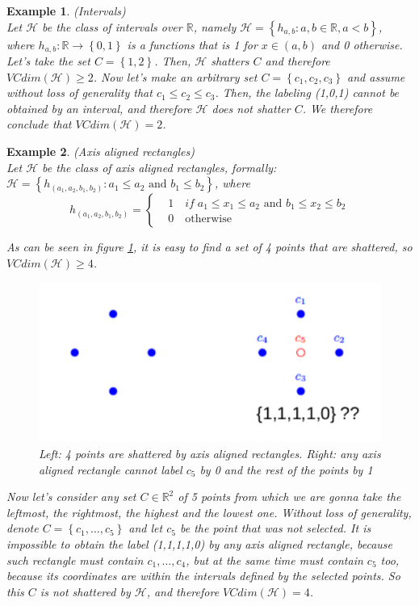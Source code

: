 \documentclass[12pt]{report}
\theoremstyle{plain}
\newtheorem{EX}{Example}
\newcommand\mcl[1]{\mathcal{#1}}
\begin{document}
\begin{flushleft}
\begin{EX} (Intervals)\\
	Let $\mcl{H}$ be the class of intervals over $\mathds{R}$, namely $\mcl{H}=\left\{h_{a,b}:a,b\in\mathds{R},a<b\right\}$, where $h_{a,b}:\mathds{R}\to\left\{0,1\right\}$ is a functions that is 1 for $x\in(a,b)$ and 0 otherwise. Let's take the set $C=\left\{1,2\right\}$. Then, $\mcl{H}$ shatters $C$ and therefore $VCdim(\mcl{H})\geq 2$. Now let's make an arbitrary set $C=\left\{c_1,c_2,c_3\right\}$ and assume without loss of generality that $c_1\leq c_2\leq c_3$. Then, the labeling (1,0,1) cannot be obtained by an interval, and therefore $\mcl{H}$ does not shatter $C$. We therefore conclude that $VCdim(\mcl{H})=2$.
\end{EX}

\begin{EX} (Axis aligned rectangles)\\
	Let $\mcl{H}$ be the class of axis aligned rectangles, formally: $\mcl{H}=\left\{h_{(a_1,a_2,b_1,b_2)}:a_1\leq a_2 \text{ and } b_1\leq b_2 \right\}$, where 
	\[ h_{(a_1,a_2,b_1,b_2)} = \left\{\begin{aligned}&1\quad if\; a_1\leq x_1\leq a_2 \text{ and } b_1\leq x_2\leq b_2\\ &0\quad\text{otherwise}\end{aligned}\right. \]
	
	As can be seen in figure \ref{fig:axis_al_rect}, it is easy to find a set of 4 points that are shattered, so $VCdim(\mcl{H})\geq 4$. 
	\begin{figure}[!h]
		\centering
		\includegraphics[scale=1]{images/axis_aligned_rectangles.pdf}
		\caption{Left: 4 points are shattered by axis aligned rectangles. Right: any axis aligned rectangle cannot label $c_5$ by 0 and the rest of the points by 1}
		\label{fig:axis_al_rect}
	\end{figure}
	Now let's consider any set $C\in\mathds{R}^2$ of 5 points from which we are gonna take the leftmost, the rightmost, the highest and the lowest one. Without loss of generality, denote $C=\left\{c_1,\dots,c_5\right\}$ and let $c_5$ be the point that was not selected. It is impossible to obtain the label (1,1,1,1,0) by any axis aligned rectangle, because such rectangle must contain $c_1,\dots,c_4$, but at the same time must contain $c_5$ too, because its coordinates are within the intervals defined by the selected points. So this $C$ is not shattered by $\mcl{H}$, and therefore $VCdim(\mcl{H})=4$.
\end{EX}


\end{flushleft}
\end{document}
